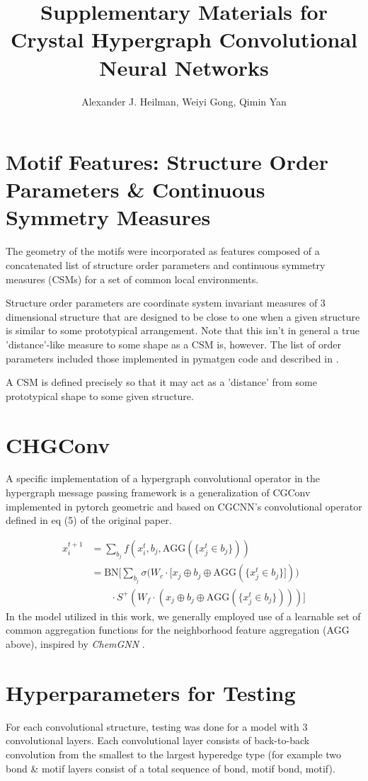 \documentclass[]{article}
\title{Supplementary Materials for Crystal Hypergraph Convolutional Neural Networks}
\author{Alexander J. Heilman, Weiyi Gong, Qimin Yan}
\begin{document}
\maketitle

\section{Motif Features: Structure Order Parameters \& Continuous Symmetry Measures}
The geometry of the motifs were incorporated as features composed of a concatenated list of structure order parameters and continuous symmetry measures (CSMs) for a set of common local environments. 

Structure order parameters are coordinate system invariant measures of 3 dimensional structure that are designed to be close to one when a given structure is similar to some prototypical arrangement. Note that this isn't in general a true 'distance'-like measure to some shape as a CSM is, however. The list of order parameters included those implemented in pymatgen code and described in \cite{orderparam1, orderparam2}.

A CSM is defined precisely so that it may act as a 'distance' from some prototypical shape to some given structure.

\section{CHGConv}\label{chgconv}
A specific implementation of a hypergraph convolutional operator in the hypergraph message passing framework is a generalization of CGConv implemented in pytorch geometric and based on CGCNN's convolutional operator defined in eq (5) of the original paper.

\begin{align*}
	x_i^{t+1} &= \sum_{b_j} f(x_i^t, b_j,\text{AGG}(\lbrace x_j^t\in b_j \rbrace )) \\ 
	& = \text{BN}\bigg[\sum_{b_j}\sigma \big(W_c\cdot [x_j\oplus b_j\oplus \text{AGG}(\lbrace x_j^t\in b_j \rbrace ] )\big)\\
	&\quad\quad\cdot S^+ (W_f\cdot (x_j\oplus b_j\oplus \text{AGG}(\lbrace x_j^t\in b_j \rbrace ) )  ) \bigg]
\end{align*}
In the model utilized in this work, we generally employed use of a learnable set of common aggregation functions for the neighborhood feature aggregation ($\text{AGG}$ above), inspired by \textit{ChemGNN} \cite{chemgnn}.

\section{Hyperparameters for Testing}\label{app:hyperparam}
For each convolutional structure, testing was done for a model with 3 convolutional layers. Each convolutional layer consists of back-to-back convolution from the smallest to the largest hyperedge type (for example two bond \& motif layers consist of a total sequence of bond, motif bond, motif). 
\end{document}
